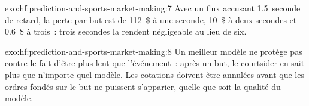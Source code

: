 \begin{solution}{exo:hf:prediction-and-sports-market-making:7}
Avec un flux accusant 1.5~seconde de retard, la perte par but est de 112~\$ à une seconde, 10~\$ à deux secondes et 0.6~\$ à trois~: trois secondes la rendent négligeable au lieu de six.
\end{solution}

\begin{solution}{exo:hf:prediction-and-sports-market-making:8}
Un meilleur modèle ne protège pas contre le fait d'être plus lent que l'événement~: après un but, le courtsider en sait plus que n'importe quel modèle. Les cotations doivent être
annulées avant que les ordres fondés sur le but ne puissent s'apparier, quelle que soit la qualité du modèle.
\end{solution}

